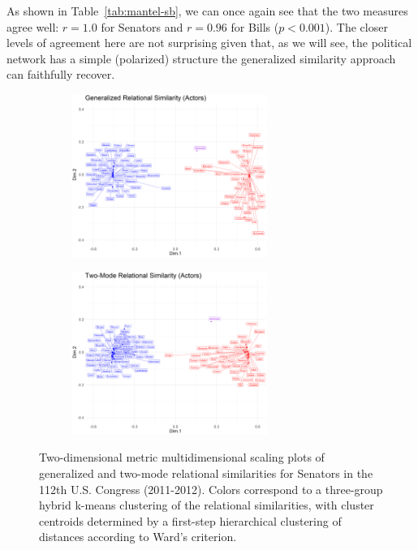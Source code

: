 \documentclass[a4paper,fleqn]{cas-sc}
\begin{document}
As shown in Table~\ref{tab:mantel-sb}, we can once again see that the two measures agree well: $r = 1.0$ for Senators and $r = 0.96$ for Bills ($p < 0.001$). The closer levels of agreement here are not surprising given that, as we will see, the political network has a simple (polarized) structure the generalized similarity approach can faithfully recover.

\begin{figure}[ht!]
     \begin{subfigure}[b]{1.0\textwidth}
        \centering
        \includegraphics[width=0.7\textwidth]{Plots/grs-actors-sb.png}
        \caption{}
        \label{fig:grs-actors-sb}
    \end{subfigure} 
     \begin{subfigure}[b]{1.0\textwidth}
        \centering
        \includegraphics[width=0.7\textwidth]{Plots/tmrs-actors-sb.png}
        \caption{}
        \label{fig:tmrs-actors-sb}
    \end{subfigure} 
    \caption{Two-dimensional metric multidimensional scaling plots of generalized and two-mode relational similarities for Senators in the 112th U.S. Congress (2011-2012). Colors correspond to a three-group hybrid k-means clustering of the relational similarities, with cluster centroids determined by a first-step hierarchical clustering of distances according to Ward's \citeyearpar{ward63} criterion.}
    \label{fig:actors-sb}
 \end{figure}
\end{document}
